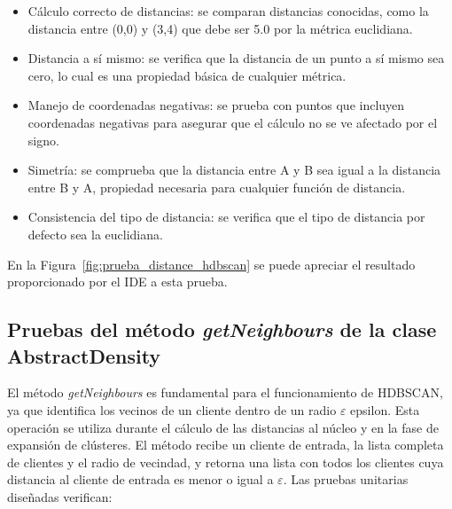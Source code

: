 \begin{itemize}
  \item C\'alculo correcto de distancias: se comparan distancias conocidas, como la distancia entre (0,0) y (3,4) que debe ser 5.0 por la m\'etrica euclidiana.
  \item Distancia a s\'i mismo: se verifica que la distancia de un punto a s\'i mismo sea cero, lo cual es una propiedad b\'asica de cualquier m\'etrica.
  \item Manejo de coordenadas negativas: se prueba con puntos que incluyen coordenadas negativas para asegurar que el c\'alculo no se ve afectado por el signo.
  \item Simetr\'ia: se comprueba que la distancia entre A y B sea igual a la distancia entre B y A, propiedad necesaria para cualquier funci\'on de distancia.
  \item Consistencia del tipo de distancia: se verifica que el tipo de distancia por defecto sea la euclidiana.
\end{itemize}

En la Figura~\ref{fig:prueba_distance_hdbscan} se puede apreciar el resultado proporcionado por el IDE a esta prueba.


\subsection{Pruebas del m\'etodo \textit{getNeighbours} de la clase AbstractDensity}

El m\'etodo \textit{getNeighbours} es fundamental para el funcionamiento de HDBSCAN, ya que identifica los vecinos de un cliente dentro de un radio \(\varepsilon\) epsilon. Esta operaci\'on se utiliza durante el c\'alculo de las distancias al n\'ucleo y en la fase de expansi\'on de cl\'usteres. El m\'etodo recibe un cliente de entrada, la lista completa de clientes y el radio de vecindad, y retorna una lista con todos los clientes cuya distancia al cliente de entrada es menor o igual a \(\varepsilon\). Las pruebas unitarias dise\~nadas verifican:

